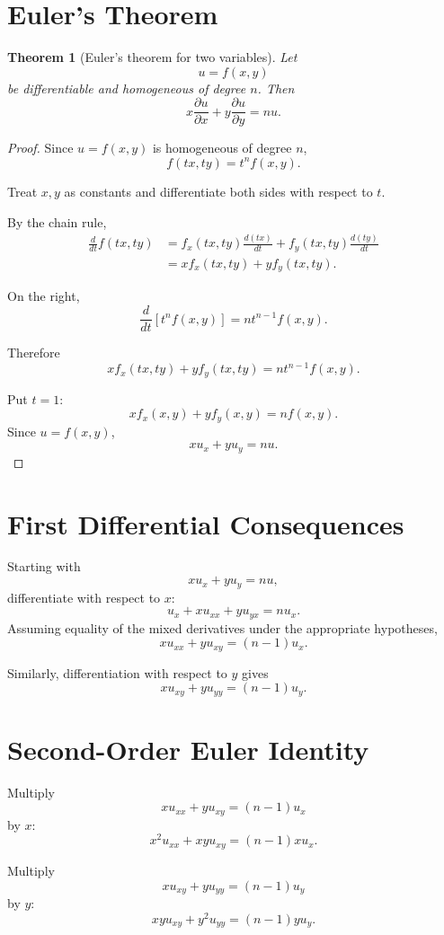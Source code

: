 \documentclass[11pt,oneside]{book}
\theoremstyle{studentthm}
\newtheorem{theorem}{Theorem}[chapter]
\theoremstyle{definition}
\newcommand{\pd}[2]{\frac{\partial #1}{\partial #2}}
\begin{document}
\section{Euler's Theorem}

\begin{theorem}[Euler's theorem for two variables]
Let
\[
u=f(x,y)
\]
be differentiable and homogeneous of degree \(n\). Then
\[
x\pd{u}{x}
+
y\pd{u}{y}
=
nu.
\]
\end{theorem}

\begin{proof}
Since \(u=f(x,y)\) is homogeneous of degree \(n\),
\[
f(tx,ty)=t^n f(x,y).
\]

Treat \(x,y\) as constants and differentiate both sides with respect
to \(t\).

By the chain rule,
\[
\begin{aligned}
\frac{d}{dt}f(tx,ty)
&=
f_x(tx,ty)\frac{d(tx)}{dt}
+
f_y(tx,ty)\frac{d(ty)}{dt}\\
&=
x f_x(tx,ty)
+
y f_y(tx,ty).
\end{aligned}
\]

On the right,
\[
\frac{d}{dt}
[t^n f(x,y)]
=
nt^{n-1}f(x,y).
\]

Therefore
\[
x f_x(tx,ty)
+
y f_y(tx,ty)
=
nt^{n-1}f(x,y).
\]

Put \(t=1\):
\[
x f_x(x,y)+y f_y(x,y)=nf(x,y).
\]
Since \(u=f(x,y)\),
\[
xu_x+yu_y=nu.
\]
\end{proof}

\section{First Differential Consequences}

Starting with
\[
xu_x+yu_y=nu,
\]
differentiate with respect to \(x\):
\[
u_x+xu_{xx}+yu_{yx}=nu_x.
\]
Assuming equality of the mixed derivatives under the appropriate
hypotheses,
\[
xu_{xx}+yu_{xy}=(n-1)u_x.
\]

Similarly, differentiation with respect to \(y\) gives
\[
xu_{xy}+yu_{yy}=(n-1)u_y.
\]

\section{Second-Order Euler Identity}

Multiply
\[
xu_{xx}+yu_{xy}=(n-1)u_x
\]
by \(x\):
\[
x^2u_{xx}+xyu_{xy}=(n-1)xu_x.
\]

Multiply
\[
xu_{xy}+yu_{yy}=(n-1)u_y
\]
by \(y\):
\[
xyu_{xy}+y^2u_{yy}=(n-1)yu_y.
\]
\end{document}
